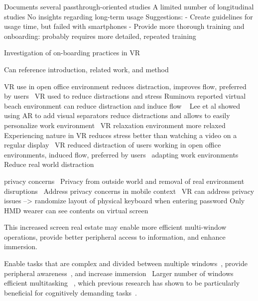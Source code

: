 \cite{bailenson2024seeing}
Documents several passthrough-oriented studies
A limited number of longitudinal studies 
No insights regarding long-term usage
Suggestions:
- Create guidelines for usage time, but failed with smartphones
- Provide more thorough training and onboarding: probably requires more detailed, repeated training

\cite{chauvergne2023onboarding}
Investigation of on-boarding practices in VR

\cite{biener2022vrweek}
Can reference introduction, related work, and method





VR use in open office environment reduces distraction, improves flow, preferred by users~\cite{ruvimova2020transportaway}
VR used to reduce distractions and stress
Ruminova reported virtual beach environment can reduce distraction and induce flow ~\cite{ruvimova2020transportaway}
 Lee et al showed using AR to add visual separators reduce distractions and allows to easily personalize work environment~\cite{lee2022partitioning}
 VR relaxation environment more relaxed~\cite{thoondee2017vrstress}
 Experiencing nature in VR reduces stress better than watching a video on a regular display~\cite{pretsch2021improving} 
VR reduced distraction of users working in open office environments, induced flow, preferred by users~\cite{ruvimova2020transportaway}  
adapting work environments \cite{ruvimova2020transportaway}
Reduce real world distraction~\cite{biener2024xrworkpublic,ruvimova2020transportaway} 

privacy concerns~\cite{gruber2018officefuture,ofek2020practicalvirtualofficemobile}
Privacy from outside world and removal of real environment disruptions~\cite{biener2022vrweek}
Address privacy concerns in mobile context~\cite{reconviguration2019schneider,gruber2018officefuture}
VR can address privacy issues --> randomize layout of physical keyboard when entering password \cite{reconviguration2019schneider} 
Only HMD wearer can see contents on virtual screen \cite{gruber2018officefuture} 




This increased screen real estate may enable more efficient multi-window operations, provide better peripheral access to information, and enhance immersion.

Enable tasks that are complex and divided between multiple windows~\cite{pavanatto2024multiplemonitors}, 
provide peripheral awareness~\cite{grudin2001digitalworlds},
and increase immersion~\cite{bi2009comparing} 
Larger number of windows~\cite{endert2012lhrd} 
efficient multitasking~\cite{czerwinski2003largedisplays}
, which previous research has shown to be particularly beneficial for cognitively demanding tasks~\cite{sightful,czerwinski2003largedisplays}.




